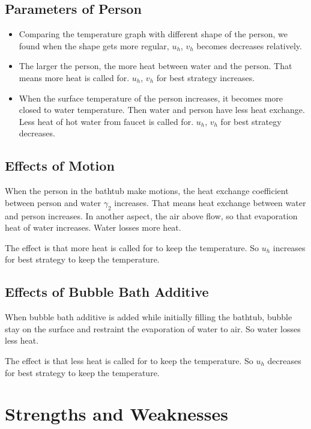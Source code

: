 \documentclass[12pt,a4paper,titlepage]{article}
\begin{document}
\subsection{Parameters of Person}
\label{sec:parameters of person}
\begin{itemize}
\item Comparing the temperature graph with different shape of the person, we found when the shape gets more regular, $u_h$, $v_h$ becomes decreases relatively.
\item The larger the person, the more heat between water and the person. That means more heat is called for. $u_h$, $v_h$ for best strategy increases.
\item When the surface temperature of the person increases, it becomes more closed to water temperature. Then water and person have less heat exchange. Less heat of hot water from faucet is called for. $u_h$, $v_h$ for best strategy decreases.
\end{itemize}

\subsection{Effects of Motion}
\label{sec:effects of motion}
When the person in the bathtub make motions, the heat exchange coefficient between person and water ${\gamma}_2$ increases. That means heat exchange between water and person increases. In another aspect, the air above flow, so that evaporation heat of water increases. Water losses more heat.

The effect is that more heat is called for to keep the temperature. So $u_h$ increases for best strategy to keep the temperature.

\subsection{Effects of Bubble Bath Additive}
\label{sec:effects of bubble bath additive}
When bubble bath additive is added while initially filling the bathtub, bubble stay on the surface and restraint the evaporation of water to air. So water losses less heat.

The effect is that less heat is called for to keep the temperature. So $u_h$ decreases for best strategy to keep the temperature.

\section{Strengths and Weaknesses}
\label{sec:strengths-and-weaknesses}
\end{document}
